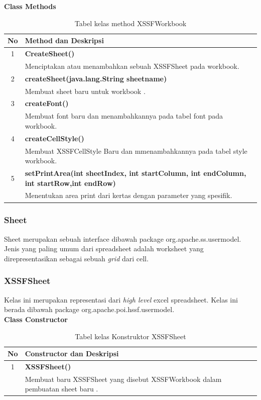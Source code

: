 \noindent \textbf{Class Methods}

\begin{table}[H]
		\centering
		\caption{Tabel kelas method XSSFWorkbook}
		\label{tab:methodXSSF}
	\begin{tabular}{|c|p{12cm}|}
		\hline
		\textbf{No} & \textbf{Method dan Deskripsi} \\ \hline \hline
		1 & \textbf{CreateSheet()}\\
			&	Menciptakan atau menambahkan sebuah XSSFSheet pada workbook.\\ \hline 
		2 & \textbf{createSheet(java.lang.String sheetname)}\\
			&	Membuat sheet baru untuk workbook .\\ \hline
		3 & \textbf{createFont()}\\
			&	Membuat font baru dan menambahkannya pada tabel font pada workbook.\\ \hline 
		4 & \textbf{createCellStyle()}\\
			&	Membuat XSSFCellStyle Baru dan mmenambahkannya pada tabel style workbook.\\ \hline
		5 & \textbf{setPrintArea(int sheetIndex, int startColumn, int endColumn, int startRow,int endRow)}\\
			&	Menentukan area print dari kertas dengan parameter yang spesifik.\\ \hline	
	\end{tabular}
	\end{table}
	
\subsubsection{Sheet}
\label{subs:Sheet}
Sheet merupakan sebuah interface dibawah package org.apache.ss.usermodel. Jenis yang paling umum dari spreadsheet adalah worksheet yang direpresentasikan sebagai sebuah \textit{grid} dari cell.\cite{apachepoi2}
	
\subsubsection{XSSFSheet}
\label{subs:XSSFSheet}
Kelas ini merupakan representasi dari \textit{high level} excel spreadsheet. Kelas ini berada dibawah package org.apache.poi.hssf.usermodel.\cite{apachepoi2}
\\
\noindent \textbf{Class Constructor}
\begin{table}[H]
		\centering
		\caption{Tabel kelas Konstruktor XSSFSheet}
		\label{tab:konstrukXSSFSheet}
	\begin{tabular}{|c|p{12cm}|}
		\hline
		\textbf{No} & \textbf{Constructor dan Deskripsi} \\ \hline \hline
		1 & \textbf{XSSFSheet()}\\
			&	Membuat baru XSSFSheet yang disebut XSSFWorkbook dalam pembuatan sheet baru .\\ \hline 
	\end{tabular}
\end{table}

